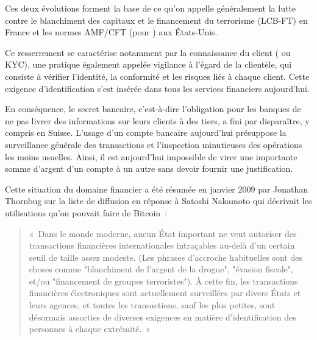 Ces deux évolutions forment la base de ce qu'on appelle généralement la lutte contre le blanchiment des capitaux et le financement du terrorisme (LCB-FT) en France et les normes AMF/CFT (pour ) aux États-Unis.

Ce resserrement se caractérise notamment par la connaissance du client ( ou KYC), une pratique également appelée vigilance à l'égard de la clientèle, qui consiste à vérifier l'identité, la conformité et les risques liés à chaque client. Cette exigence d'identification s'est insérée dans tous les services financiers aujourd'hui.

En conséquence, le secret bancaire, c'est-à-dire l'obligation pour les banques de ne pas livrer des informations sur leurs clients à des tiers, a fini par disparaître, y compris en Suisse. L'usage d'un compte bancaire aujourd'hui présuppose la surveillance générale des transactions et l'inspection minutieuses des opérations les moins usuelles. Ainsi, il est aujourd'hui impossible de virer une importante somme d'argent d'un compte à un autre sans devoir fournir une justification.

Cette situation du domaine financier a été résumée en janvier 2009 par Jonathan Thornbug sur la liste de diffusion en réponse à Satoshi Nakamoto qui décrivait les utilisations qu'on pouvait faire de Bitcoin~:

\begin{quote}
«~Dans le monde moderne, aucun État important ne veut autoriser des transactions financières internationales intraçables au-delà d'un certain seuil de taille assez modeste. (Les phrases d'accroche habituelles sont des choses comme "blanchiment de l'argent de la drogue", "évasion fiscale", et/ou "financement de groupes terroristes"). À cette fin, les transactions financières électroniques sont actuellement surveillées par divers États et leurs agences, et toutes les transactions, sauf les plus petites, sont désormais assorties de diverses exigences en matière d'identification des personnes à chaque extrémité.~»
\end{quote} %

